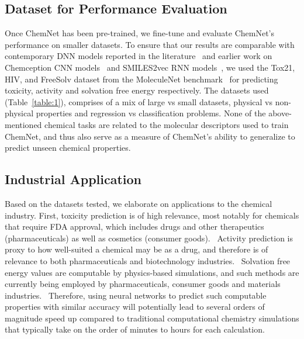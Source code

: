 \documentclass[sigconf]{acmart}
\begin{document}
\subsection{Dataset for Performance Evaluation}

Once ChemNet has been pre-trained, we fine-tune and evaluate ChemNet's performance on smaller datasets. To ensure that our results are comparable with contemporary DNN models reported in the literature~\cite{wu2017} and earlier work on Chemception CNN models~\cite{goh2017c1, goh2017c2} and SMILES2vec RNN models~\cite{goh2017s}, we used the Tox21, HIV, and FreeSolv dataset from the MoleculeNet benchmark~\cite{wu2017} for predicting toxicity, activity and solvation free energy respectively. The datasets used (Table~\ref{table:1}), comprises of a mix of large vs small datasets, physical vs non-physical properties and regression vs classification problems. None of the above-mentioned chemical tasks are related to the molecular descriptors used to train ChemNet, and thus also serve as a measure of ChemNet's ability to generalize to predict unseen chemical properties.

\subsection{Industrial Application}
Based on the datasets tested, we elaborate on applications to the chemical industry. First, toxicity prediction is of high relevance, most notably for chemicals that require FDA approval, which includes drugs and other therapeutics (pharmaceuticals) as well as cosmetics (consumer goods).~\cite{kruhlak2007} Activity prediction is proxy to how well-suited a chemical may be as a drug, and therefore is of relevance to both pharmaceuticals and biotechnology industries.~\cite{buchwald2002}  Solvation free energy values are computable by physics-based simulations, and such methods are currently being employed by pharmaceuticals, consumer goods and materials industries.~\cite{chodera2011} Therefore, using neural networks to predict such computable properties with similar accuracy will potentially lead to several orders of magnitude speed up compared to traditional computational chemistry simulations that typically take on the order of minutes to hours for each calculation.
\end{document}
